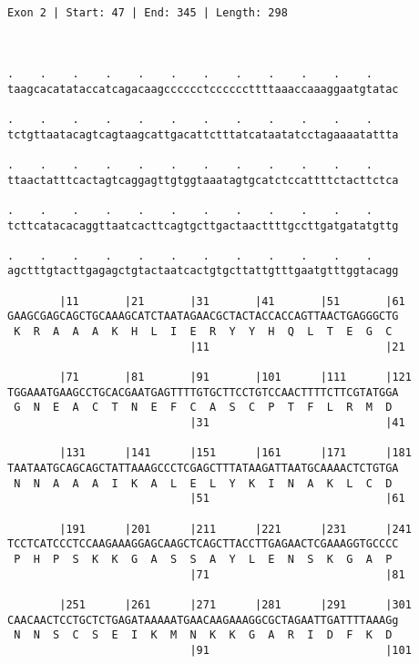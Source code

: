 \documentclass{article}
\begin{document}
\begin{Verbatim}
                                              
 
Exon 2 | Start: 47 | End: 345 | Length: 298



.    .    .    .    .    .    .    .    .    .    .    .    
taagcacatataccatcagacaagcccccctccccccttttaaaccaaaggaatgtatac
                                                            
.    .    .    .    .    .    .    .    .    .    .    .    
tctgttaatacagtcagtaagcattgacattctttatcataatatcctagaaaatattta
                                                            
.    .    .    .    .    .    .    .    .    .    .    .    
ttaactatttcactagtcaggagttgtggtaaatagtgcatctccattttctacttctca
                                                            
.    .    .    .    .    .    .    .    .    .    .    .    
tcttcatacacaggttaatcacttcagtgcttgactaacttttgccttgatgatatgttg
                                                            
.    .    .    .    .    .    .    .    .    .    .    .    
agctttgtacttgagagctgtactaatcactgtgcttattgtttgaatgtttggtacagg
                                                            
        |11       |21       |31       |41       |51       |61
GAAGCGAGCAGCTGCAAAGCATCTAATAGAACGCTACTACCACCAGTTAACTGAGGGCTG
 K  R  A  A  A  K  H  L  I  E  R  Y  Y  H  Q  L  T  E  G  C 
                            |11                           |21
  
        |71       |81       |91       |101      |111      |121
TGGAAATGAAGCCTGCACGAATGAGTTTTGTGCTTCCTGTCCAACTTTTCTTCGTATGGA
 G  N  E  A  C  T  N  E  F  C  A  S  C  P  T  F  L  R  M  D 
                            |31                           |41
  
        |131      |141      |151      |161      |171      |181
TAATAATGCAGCAGCTATTAAAGCCCTCGAGCTTTATAAGATTAATGCAAAACTCTGTGA
 N  N  A  A  A  I  K  A  L  E  L  Y  K  I  N  A  K  L  C  D 
                            |51                           |61
  
        |191      |201      |211      |221      |231      |241
TCCTCATCCCTCCAAGAAAGGAGCAAGCTCAGCTTACCTTGAGAACTCGAAAGGTGCCCC
 P  H  P  S  K  K  G  A  S  S  A  Y  L  E  N  S  K  G  A  P 
                            |71                           |81
  
        |251      |261      |271      |281      |291      |301
CAACAACTCCTGCTCTGAGATAAAAATGAACAAGAAAGGCGCTAGAATTGATTTTAAAGg
 N  N  S  C  S  E  I  K  M  N  K  K  G  A  R  I  D  F  K  D 
                            |91                           |101
  

\end{Verbatim}
\end{document}
